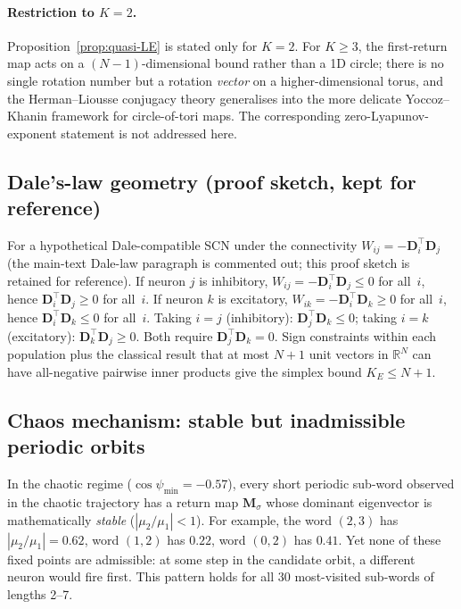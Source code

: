 \documentclass[12pt]{article}
\newcommand{\vv}[1]{\mathbf{#1}}
\newcommand{\DD}{\vv{D}}
\newcommand{\RR}{\mathbb{R}}
\begin{document}
\paragraph{Restriction to $K{=}2$.} Proposition~\ref{prop:quasi-LE} is stated only for $K{=}2$. For $K\geq 3$, the first-return map acts on a $(N{-}1)$-dimensional bound rather than a 1D circle; there is no single rotation number but a rotation \emph{vector} on a higher-dimensional torus, and the Herman--Liousse conjugacy theory generalises into the more delicate Yoccoz--Khanin framework for circle-of-tori maps. The corresponding zero-Lyapunov-exponent statement is not addressed here.

\subsection{Dale's-law geometry (proof sketch, kept for reference)}\label{app:dale-proof}

For a hypothetical Dale-compatible SCN under the connectivity $W_{ij}=-\DD_i^\top\DD_j$ (the main-text Dale-law paragraph is commented out; this proof sketch is retained for reference). If neuron $j$ is inhibitory, $W_{ij}=-\DD_i^\top\DD_j\leq 0$ for all~$i$, hence $\DD_i^\top\DD_j\geq 0$ for all~$i$. If neuron $k$ is excitatory, $W_{ik}=-\DD_i^\top\DD_k\geq 0$ for all~$i$, hence $\DD_i^\top\DD_k\leq 0$ for all~$i$. Taking $i=j$ (inhibitory): $\DD_j^\top\DD_k\leq 0$; taking $i=k$ (excitatory): $\DD_k^\top\DD_j\geq 0$. Both require $\DD_j^\top\DD_k=0$. Sign constraints within each population plus the classical result that at most $N+1$ unit vectors in $\RR^N$ can have all-negative pairwise inner products give the simplex bound $K_E\leq N+1$.



\subsection{Chaos mechanism: stable but inadmissible periodic orbits}\label{app:chaos-mechanism}

In the chaotic regime ($\cos\psi_{\min}=-0.57$), every short periodic sub-word observed in the chaotic trajectory has a return map $\vv{M}_\sigma$ whose dominant eigenvector is mathematically \emph{stable} ($|\mu_2/\mu_1|<1$). For example, the word $(2,3)$ has $|\mu_2/\mu_1|=0.62$, word $(1,2)$ has $0.22$, word $(0,2)$ has $0.41$. Yet none of these fixed points are admissible: at some step in the candidate orbit, a different neuron would fire first. This pattern holds for all 30 most-visited sub-words of lengths 2--7.
\end{document}
